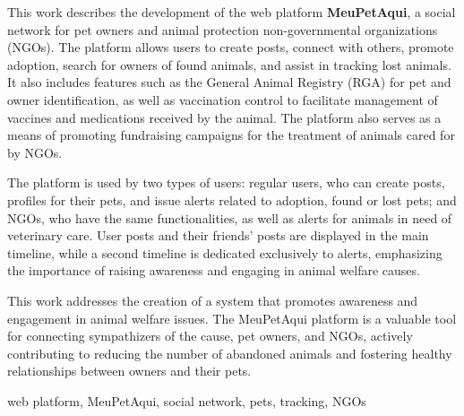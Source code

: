 \clearpage\newpage\pagebreak%
\pagestyle{plain}

\Abstract

This work describes the development of the web platform {\bf MeuPetAqui}, a social network for pet owners and animal protection non-governmental organizations (\gls{NGOs}). The platform allows users to create posts, connect with others, promote adoption, search for owners of found animals, and assist in tracking lost animals. It also includes features such as the General Animal Registry (\gls{RGA}) for pet and owner identification, as well as vaccination control to facilitate management of vaccines and medications received by the animal. The platform also serves as a means of promoting fundraising campaigns for the treatment of animals cared for by NGOs.

The platform is used by two types of users: regular users, who can create posts, profiles for their pets, and issue alerts related to adoption, found or lost pets; and NGOs, who have the same functionalities, as well as alerts for animals in need of veterinary care. User posts and their friends' posts are displayed in the main timeline, while a second timeline is dedicated exclusively to alerts, emphasizing the importance of raising awareness and engaging in animal welfare causes.

This work addresses the creation of a system that promotes awareness and engagement in animal welfare issues. The MeuPetAqui platform is a valuable tool for connecting sympathizers of the cause, pet owners, and NGOs, actively contributing to reducing the number of abandoned animals and fostering healthy relationships between owners and their pets.

\begin{keywords}
web platform, MeuPetAqui, social network, pets, tracking, NGOs
\end{keywords}